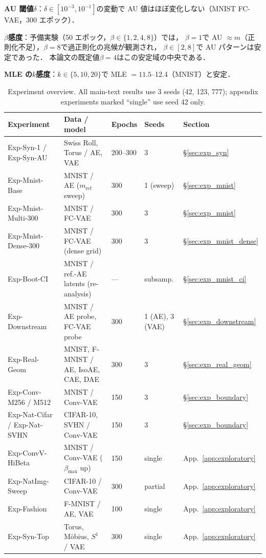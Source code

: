 \documentclass[11pt,a4paper]{jsarticle}
\begin{document}
\textbf{AU 閾値$\delta$}：$\delta \in [10^{-3}, 10^{-1}]$の変動で
AU 値はほぼ変化しない（MNIST FC-VAE，300 エポック）．

\textbf{$\beta$感度}：予備実験（50 エポック，$\beta \in \{1, 2, 4, 8\}$）では，
$\beta = 1$で AU $\approx m$（正則化不足），$\beta = 8$で過正則化の兆候が観測され，
$\beta \in [2, 8]$で AU パターンは安定であった．
本論文の既定値$\beta = 4$はこの安定域の中央である．

\textbf{MLE の$k$感度}：$k \in \{5, 10, 20\}$で MLE $= 11.5$--12.4（MNIST）と安定．

\begin{table}[H]
\centering
\caption{Experiment overview. All main-text results use 3 seeds
(42, 123, 777); appendix experiments marked ``single'' use seed 42 only.}
\label{tab:exp_list}
\small
\begin{tabular}{p{3.4cm}p{3.4cm}p{2.2cm}p{1.6cm}p{2.2cm}}
\toprule
Experiment & Data / model & Epochs & Seeds & Section \\
\midrule
Exp-Syn-1 / Exp-Syn-AU & Swiss Roll, Torus / AE, VAE & 200--300 & 3 & §\ref{sec:exp_syn} \\
Exp-Mnist-Base & MNIST / AE ($m_{\mathrm{ref}}$ sweep) & 300 & 1 (sweep) & §\ref{sec:exp_mnist} \\
Exp-Mnist-Multi-300 & MNIST / FC-VAE & 300 & 3 & §\ref{sec:exp_mnist} \\
Exp-Mnist-Dense-300 & MNIST / FC-VAE (dense grid) & 300 & 3 & §\ref{sec:exp_mnist_dense} \\
Exp-Boot-CI & MNIST / ref.-AE latents (re-analysis) & --- & subsamp. & §\ref{sec:exp_mnist_ci} \\
Exp-Downstream & MNIST / AE probe, FC-VAE probe & 300 & 1 (AE), 3 (VAE) & §\ref{sec:exp_downstream} \\
Exp-Real-Geom & MNIST, F-MNIST / AE, IsoAE, CAE, DAE & 300 & 3 & §\ref{sec:exp_real_geom} \\
Exp-Conv-M256 / M512 & MNIST / Conv-VAE & 150 & 3 & §\ref{sec:exp_boundary} \\
Exp-Nat-Cifar / Exp-Nat-SVHN & CIFAR-10, SVHN / Conv-VAE & 150 & 3 & §\ref{sec:exp_boundary} \\
Exp-ConvV-HiBeta & MNIST / Conv-VAE ($\beta_{\max}$ up) & 150 & single & App.~\ref{app:exploratory} \\
Exp-NatImg-Sweep & CIFAR-10 / Conv-VAE & 300 & partial & App.~\ref{app:exploratory} \\
Exp-Fashion & F-MNIST / AE, VAE & 100 & single & App.~\ref{app:exploratory} \\
Exp-Syn-Top & Torus, M\"obius, $S^1$ / VAE & 300 & single & App.~\ref{app:exploratory} \\
\bottomrule
\end{tabular}
\end{table}
\end{document}
